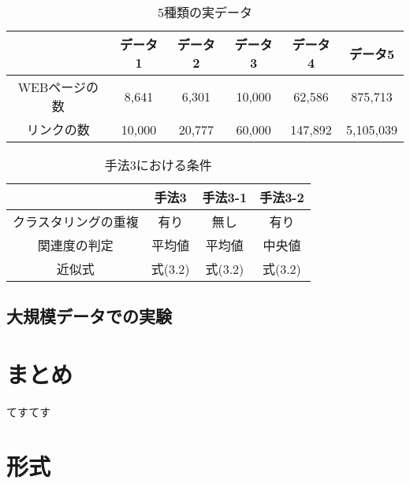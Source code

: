 \documentclass[a4paper,11pt]{jreport}
\begin{document}
\begin{table}[htb]
\begin{center}
\caption{5種類の実データ}
\begin{tabular}{|c||c|c|c|c|c|} \hline
    & データ1 & データ2 & データ3 & データ4 & データ5 \\ \hline \hline
    WEBページの数 & 8,641 & 6,301 & 10,000 & 62,586 & 875,713 \\ \hline
    リンクの数 & 10,000 & 20,777 & 60,000 & 147,892 & 5,105,039 \\  \hline
\end{tabular}
\end{center}
\end{table}












\begin{table}[htb]
\begin{center}
\caption{手法3における条件}
\begin{tabular}{|c||c|c|c|} \hline 
    & 手法3 & 手法3-1 & 手法3-2 \\ \hline \hline
    クラスタリングの重複 & 有り & 無し & 有り \\  \hline
    関連度の判定 & 平均値 & 平均値 & 中央値 \\ \hline
    近似式 & 式(3.2) & 式(3.2) & 式(3.2) \\ \hline
\end{tabular}
\end{center}
\end{table}



\section{大規模データでの実験}

\chapter{まとめ}

てすてす

\chapter{形式}
\end{document}
